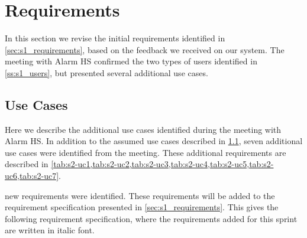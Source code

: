 \section{Requirements} \label{sec:s2_reqs}
In this section we revise the initial requirements identified in \cref{sec:s1_requirements}, based on the feedback we received on our system. The meeting with Alarm HS confirmed the two types of users identified in \cref{ss:s1_users}, but presented several additional use cases.

\subsection{Use Cases} \label{ss:s1_uc}
Here we describe the additional use cases identified during the meeting with Alarm HS. In addition to the assumed use cases described in \cref{ss:s1_uc}, seven additional use cases were identified from the meeting. These additional requirements are described in \cref{tab:s2-uc1,tab:s2-uc2,tab:s2-uc3,tab:s2-uc4,tab:s2-uc5,tab:s2-uc6,tab:s2-uc7}.





new requirements were identified. These requirements will be added to the requirement specification presented in \cref{sec:s1_requirements}. This gives the following requirement specification, where the requirements added for this sprint are written in italic font.

